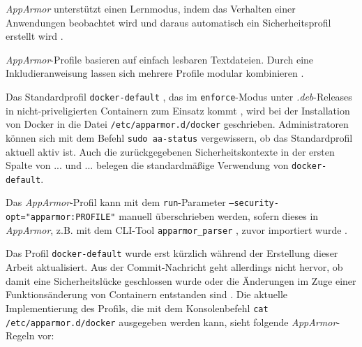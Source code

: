 \documentclass[../main.tex]{subfiles}
\begin{document}
				\emph{AppArmor} unterstützt einen Lernmodus, indem das Verhalten einer Anwendungen beobachtet wird und daraus automatisch ein Sicherheitsprofil erstellt wird \cite{linuxSecOverview}.

				\emph{AppArmor}-Profile basieren auf einfach lesbaren Textdateien. Durch eine Inkludieranweisung lassen sich mehrere Profile modular kombinieren \cite{apparmorQuickProfileLanguage}.

				Das Standardprofil \texttt{docker-default} \cite{githubAppArmorProfileContainer}, das im \texttt{enforce}-Modus unter \emph{.deb}-Releases in nicht-priveligierten Containern zum Einsatz kommt \cite{docker110Security}, wird bei der Installation von Docker in die Datei \texttt{/etc/apparmor.d/docker} geschrieben. Administratoren können sich mit dem Befehl \texttt{sudo aa-status} vergewissern, ob das Standardprofil aktuell aktiv ist. Auch die zurückgegebenen Sicherheitskontexte in der ersten Spalte von \fig ... und \fig ... belegen die standardmäßige Verwendung von \texttt{docker-default}.

				Das \emph{AppArmor}-Profil kann mit dem \texttt{run}-Parameter \texttt{--security-opt="apparmor:PROFILE"} manuell überschrieben werden, sofern dieses in \emph{AppArmor}, z.B. mit dem \acrshort{CLI}-Tool \texttt{apparmor\_parser} \cite{apparmorParser}, zuvor importiert wurde \cite{dockerRun}.

				Das Profil \texttt{docker-default} wurde erst kürzlich während der Erstellung dieser Arbeit aktualisiert. Aus der Commit-Nachricht geht allerdings nicht hervor, ob damit eine Sicherheitslücke geschlossen wurde oder die Änderungen im Zuge einer Funktionsänderung von Containern entstanden sind \cite{githubAppArmorProfileContainerFix}. Die aktuelle Implementierung des Profils, die mit dem Konsolenbefehl \texttt{cat /etc/apparmor.d/docker} ausgegeben werden kann, sieht folgende \emph{AppArmor}-Regeln vor:
\end{document}
